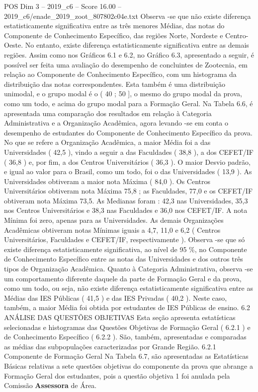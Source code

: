 \begin{textsample}{POS Dim 3 – 2019\_c6 – Score 16.00 – 2019\_c6/enade\_2019\_zoot\_807802c04e.txt}
Observa -se que não existe diferença estatisticamente significativa entre as três menores Médias, das notas do Componente de Conhecimento Específico, das regiões Norte, Nordeste e Centro-Oeste.
No entanto, existe diferença estatisticamente significativa entre as demais regiões.
Assim como nos Gráficos 6.1 e 6.2, no Gráfico 6.3, apresentado a seguir, é possível ser feita uma avaliação do desempenho de concluintes de Zootecnia, em relação ao Componente de Conhecimento Específico, com um histograma da distribuição das notas correspondentes.
Esta também é uma distribuição unimodal, e o grupo modal é o ( 40 ; 50 ], o mesmo do grupo modal da prova, como um todo, e acima do grupo modal para a Formação Geral.
Na Tabela 6.6, é apresentada uma comparação dos resultados em relação à Categoria Administrativa e a Organização Acadêmica, agora levando -se em conta o desempenho de estudantes do Componente de Conhecimento Específico da prova.
No que se refere a Organização Acadêmica, a maior Média foi a das Universidades ( 42,5 ), vindo a seguir a das Faculdades ( 38,8 ), a dos CEFET/IF ( 36,8 ) e, por fim, a dos Centros Universitários ( 36,3 ).
O maior Desvio padrão, e igual ao valor para o Brasil, como um todo, foi o das Universidades ( 13,9 ).
As Universidades obtiveram a maior nota Máxima ( 84,0 ).
Os Centros Universitários obtiveram nota Máxima 75,8 ; as Faculdades, 77,0 e os CEFET/IF obtiveram nota Máxima 73,5.
As Medianas foram : 42,3 nas Universidades, 35,3 nos Centros Universitários e 38,3 nas Faculdades e 36,0 nos CEFET/IF.
A nota Mínima foi zero, apenas para as Universidades.
As demais Organizações Acadêmicas obtiveram notas Mínimas iguais a 4,7, 11,0 e 6,2 ( Centros Universitários, Faculdades e CEFET/IF, respectivamente ).
Observa -se que só existe diferença estatisticamente significativa, ao nível de 95 \%, no Componente de Conhecimento Específico entre as notas das Universidades e dos outros três tipos de Organização Acadêmica.
Quanto à Categoria Administrativa, observa -se um comportamento diferente daquele da parte de Formação Geral e da prova, como um todo, ou seja, não existe diferença estatisticamente significativa entre as Médias das IES Públicas ( 41,5 ) e das IES Privadas ( 40,2 ).
Neste caso, também, a maior Média foi obtida por estudantes de IES Públicas de ensino. 6.2 ANÁLISE DAS QUESTÕES OBJETIVAS Esta seção apresenta estatísticas selecionadas e histogramas das Questões Objetivas de Formação Geral ( 6.2.1 ) e de Conhecimento Específico ( 6.2.2 ).
São, também, apresentadas e comparadas as médias das subpopulações caracterizadas por Grande Região. 6.2.1 Componente de Formação Geral Na Tabela 6.7, são apresentadas as Estatísticas Básicas relativas a sete questões objetivas do componente da prova que abrange a Formação Geral dos estudantes, pois a questão objetiva 1 foi anulada pela Comissão \textbf{Assessora} de Área.

\end{textsample}
